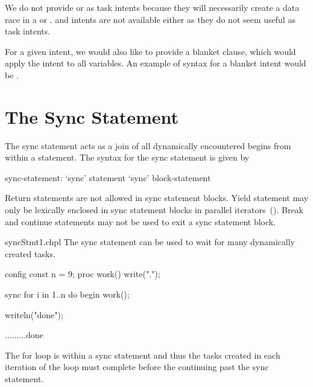 \begin{rationale}
We do not provide  or  as task intents because they
will necessarily create a data race in a  or .
 and  intents are not available either
as they do not seem useful as task intents.
\end{rationale}

\begin{future}
For a given intent, we would also like to provide a blanket clause,
which would apply the intent to all variables.
An example of syntax for a blanket  intent would be .
\end{future}


\section{The Sync Statement}
\label{Sync_Statement}

The sync statement acts as a join of all dynamically encountered
begins from within a statement.  The syntax for the sync statement is
given by
\begin{syntax}
sync-statement:
  `sync' statement
  `sync' block-statement
\end{syntax}

Return statements are not allowed in sync statement blocks.  Yield
statement may only be lexically enclosed in sync statement blocks in
parallel iterators~().  Break and continue
statements may not be used to exit a sync statement block.

\begin{chapelexample}{syncStmt1.chpl}
The sync statement can be used to wait for many dynamically created
tasks.
\begin{chapelpre}
config const n = 9;
proc work() {
  write(".");
}
\end{chapelpre}
\begin{chapel}
sync for i in 1..n do begin work();
\end{chapel}
\begin{chapelpost}
writeln("done");
\end{chapelpost}
\begin{chapeloutput}
.........done
\end{chapeloutput}
The for loop is within a sync statement and thus the tasks created
in each iteration of the loop must complete before the continuing past
the sync statement.
\end{chapelexample}

